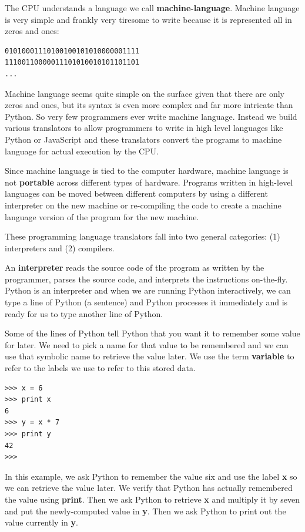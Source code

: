 The CPU understands a language we call {\bf machine-language}.  Machine
language is very simple and frankly very tiresome to write because it 
is represented all in zeros and ones:

\beforeverb
\begin{verbatim}
01010001110100100101010000001111
11100110000011101010010101101101
...
\end{verbatim}
\afterverb
%
Machine language seems quite simple on the surface given that there 
are only zeros and ones, but its syntax is even more complex
and far more intricate than Python.  So very few programmers ever write
machine language.  Instead we build various translators to allow
programmers to write in high level languages like Python or JavaScript
and these translators convert the programs to machine language for actual
execution by the CPU.

Since machine language is tied to the computer hardware, machine language
is not {\bf portable} across different types of hardware.  Programs written in 
high-level languages can be moved between different computers by using a 
different interpreter on the new machine or re-compiling the code to create
a machine language version of the program for the new machine.

These programming language translators fall into two general categories:
(1) interpreters and (2) compilers.

An {\bf interpreter} reads the source code of the program as written by the
programmer, parses the source code, and interprets the instructions on-the-fly.
Python is an interpreter and when we are running Python interactively, 
we can type a line of Python (a sentence) and Python processes it immediately
and is ready for us to type another line of Python.   

Some of the lines of Python tell Python that you want it to remember some 
value for later.   We need to pick a name for that value to be remembered and
we can use that symbolic name to retrieve the value later.  We use the 
term {\bf variable} to refer to the labels we use to refer to this stored data.

\beforeverb
\begin{verbatim}
>>> x = 6
>>> print x
6
>>> y = x * 7
>>> print y
42
>>> 
\end{verbatim}
\afterverb
%
In this example, we ask Python to remember the value six and use the label {\bf x}
so we can retrieve the value later.   We verify that Python has actually remembered
the value using {\bf print}. Then we ask Python to retrieve {\bf x} and multiply
it by seven and put the newly-computed value in {\bf y}.  Then we ask Python to print out
the value currently in {\bf y}.

